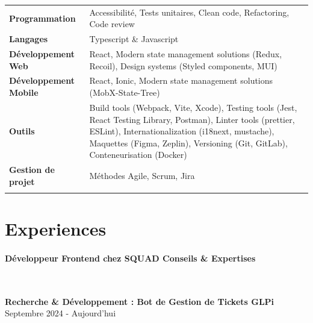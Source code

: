 \documentclass{article}
\begin{document}
\begin{tabularx}{\textwidth}{@{}lX@{}}

  \textbf{Programmation} & Accessibilité, Tests unitaires, Clean code, Refactoring, Code review \\
  \addlinespace[5pt] %

  \textbf{Langages} & Typescript \& Javascript \\
  \addlinespace[5pt] %

  \textbf{Développement Web} & React, Modern state management solutions (Redux, Recoil), Design systems (Styled components, MUI) \\
  \addlinespace[5pt] %

  \textbf{Développement Mobile} & React, Ionic, Modern state management solutions (MobX-State-Tree) \\
  \addlinespace[5pt] %

  \textbf{Outils} & Build tools (Webpack, Vite, Xcode), Testing tools (Jest, React Testing Library, Postman), Linter tools (prettier, ESLint), Internationalization (i18next, mustache), Maquettes (Figma, Zeplin), Versioning (Git, GitLab), Conteneurisation (Docker) \\
  \addlinespace[5pt] %

  \textbf{Gestion de projet} & Méthodes Agile, Scrum, Jira \\
  \addlinespace[5pt] %
  
\end{tabularx}

\vspace{4ex}
\hrulefill
\section*{Experiences}

\paragraph{Développeur Frontend chez SQUAD Conseils \& Expertises}\

\noindent
\textbf{Recherche \& Développement : Bot de Gestion de Tickets GLPi} \hspace*{\fill}Septembre 2024 - Aujourd'hui
\end{document}
